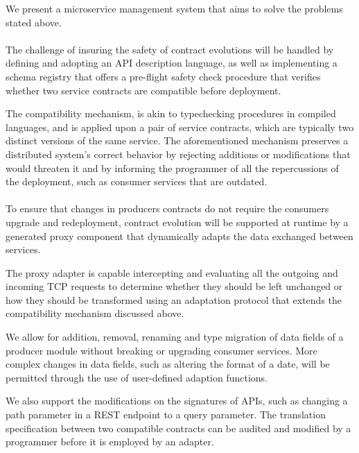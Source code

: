 We present a microservice management system that aims to solve the problems stated above.

\paragraph{}

The challenge of insuring the safety of contract evolutions will be handled by defining and adopting an API description language, as well as implementing a schema
registry that offers a pre-flight safety check procedure that verifies whether two service contracts are compatible before
deployment.

The compatibility mechanism, is akin to typechecking procedures in compiled languages, and is applied upon a
pair of service contracts, which are typically two distinct versions of the same service. The aforementioned mechanism preserves
a distributed system's correct behavior by rejecting additions or modifications that would threaten it and by informing the programmer
of all the repercussions of the deployment, such as consumer services that are outdated.

\paragraph{}

To ensure that changes in producers contracts do not require the consumers upgrade and redeployment, contract evolution
will be supported at runtime by a generated proxy component that dynamically adapts the data exchanged between services.

The proxy adapter is capable intercepting and evaluating all the outgoing and incoming TCP requests to determine whether
they should be left unchanged or how they should be transformed using an adaptation protocol that extends the compatibility mechanism discussed above.

We allow for addition, removal, renaming and type migration of data fields of a producer module without breaking or upgrading consumer services.
More complex changes in data fields, such as altering the format of a date, will be permitted through the use of user-defined adaption functions.

We also support the modifications on the signatures of APIs, such as changing a path parameter in a REST endpoint to a query parameter.
The translation specification between two compatible contracts can be audited and modified by a programmer before it is employed by an adapter.

